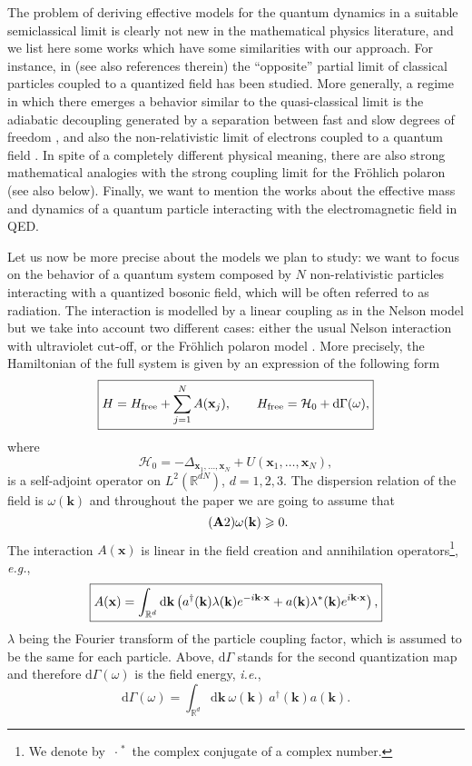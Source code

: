 \documentclass[11pt,a4paper,reqno]{amsart}
\theoremstyle{definition}
\newcommand{\hfree}{H_{\mathrm{free}}}
\numberwithin{equation}{section}
\newcommand{\beq}{\begin{equation}}
\newcommand{\eeq}{\end{equation}}
\renewcommand{\geq}{\geqslant}
\newcommand{\disp}{\displaystyle}
\newcommand{\lf}{\left}
\newcommand{\ri}{\right}
\newcommand{\xv}{\mathbf{x}}
\newcommand{\kv}{\mathbf{k}}
\newcommand{\diff}{\mathrm{d}}
\newcommand{\R}{\mathbb{R}}
\newcommand{\HH}{\mathcal{H}}
\begin{document}
The problem of deriving effective models for the quantum dynamics in a suitable semiclassical limit is clearly
not new in the mathematical physics literature, and we list here some works which have some similarities with
our approach. For instance, in \cite{MR2399613, MR3057191} (see also references therein) the ``opposite''
partial limit of classical particles coupled to a quantized field has been studied. More generally, a regime
in which there emerges a behavior similar to the quasi-classical limit is the adiabatic decoupling generated
by a separation between fast and slow degrees of freedom \cite{PST2003,Teu2003,PST2007}, and also the
non-relativistic limit of electrons coupled to a quantum field \cite{MR1075749,MR1235953,MR1638093}. In spite
of a completely different physical meaning, there are also strong mathematical analogies with the strong
coupling limit for the Fr\"{o}hlich polaron \cite{Frank:2014aa,Frank:2015aa,Griesemer:2016aa} (see also
below). Finally, we want to mention the works \cite{BCFS2007,BCFFS2013} about the effective mass and dynamics
of a quantum particle interacting with the electromagnetic field in QED.


Let us now be more precise about the models we plan to study: we want to focus on the behavior of a quantum system composed by $ N $ non-relativistic particles interacting with a quantized bosonic field, which will be often referred to as radiation. The interaction is modelled by a linear coupling as in the Nelson model \cite{nelson:1190} but we take into account two different cases: either the usual Nelson interaction with ultraviolet cut-off, or the Fr\"{o}hlich polaron model \cite{Frohlich230}.  More precisely, the Hamiltonian of the full system is given by an expression of the following form
\beq
	\label{eq:full ham}
	\framebox{$ H = \hfree + \disp\sum_{j = 1}^N A(\xv_j),	\qquad		\hfree = \HH_0 + \diff \Gamma(\omega), $}
\eeq
where
\beq
	\label{eq:h0}
	\HH_0 =  - \Delta_{\xv_1,\ldots,\xv_N} + U(\xv_1, \ldots, \xv_N),
\eeq
is a self-adjoint operator on $ L^2(\R^{dN}) $, $ d = 1, 2, 3 $. The dispersion relation of the field is $ \omega(\kv) $ and throughout the paper we are going to assume that
\beq
	\label{eq:omega}\tag{{\bf A}2}
	\omega(\kv) \geq 0.		
\eeq
The interaction $ A(\xv) $ is linear in the field creation and annihilation operators\footnote{We denote by $ {\: \cdot \:}^* $ the complex conjugate of a complex number.}, \emph{e.g.},
\beq
	\label{eq:A}
	\framebox{$ A(\xv) = \disp\int_{\mathbb{R}^d} \diff \kv  \lf( a^{\dagger}(\kv) \lambda(\kv) e^{-i \kv \cdot \xv} + a(\kv)  \lambda^{*}(\kv) e^{i \kv \cdot \xv} \ri), $}
\eeq
$ \lambda $ being the Fourier transform of the particle coupling factor, which is assumed to be the same for each particle. Above, $ \diff \Gamma $ stands for the second quantization map and therefore $ \diff \Gamma(\omega) $ is the field energy, \emph{i.e.},
\beq
	\label{eq:field energy}
	\diff \Gamma(\omega) = \int_{\R^d} \diff \kv \: \omega(\kv) \: a^{\dagger}(\kv) a(\kv).
\eeq
 
\end{document}
